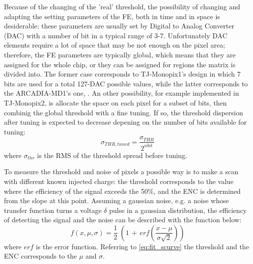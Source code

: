         Because of the changing of the 'real' threshold, the possibility of changing and adapting the setting parameters of the FE, both in time and in space is desiderable: these parameters are usually set by Digital to Analog Converter (DAC) with a number of bit in a typical range of 3-7.
        Unfortunately DAC elements require a lot of space that may be not enough on the pixel area; therefore, the FE parameters are typically global, which means that they are assigned for the whole chip, or they can be assigned for regions the matrix is divided into. 
        The former case corresponds to TJ-Monopix1's design in which 7 bits are used for a total 127-DAC possible values, while the latter corresponds to the ARCADIA-MD1's one, . 
        An other possibility, for example implemented in TJ-Monopix2, is allocate the space on each pixel for a subset of bits, then combinig the global threshold with a fine tuning. 
        If so, the threshold dispersion after tuning is expected to decrease depening on the number of bits available for tuning:
        \begin{equation}
            \sigma_{THR, tuned} = \frac{\sigma_{THR}}{2^{n bit}}
        \end{equation}    
        where $\sigma_{thr}$ is the RMS of the threshold spread before tuning.

        To measure the threshold and noise of pixels a possible way is to make a scan with different known injected charge: the threshold corresponds to the value where the efficiency of the signal exceeds the 50\%, and the ENC is determined from the slope at this point.        
        Assuming a gaussian noise, e.g. a noise whose transfer function turns a voltage $\delta$ pulse in a gaussian distribution, the efficiency of detecting the signal and the noise can be described with  the function below:
        \begin{equation}
            f(x, \mu, \sigma) = \frac{1}{2} \; \left(1\,+\,erf\left(\frac{x-\mu}{\sigma \sqrt{2}}\right)\right)
            \label{eq:fit_scurve}
        \end{equation}
        where $erf$ is the error function. 
        Referring to \ref{eq:fit_scurve} the threshold and the ENC corresponds to the $\mu$ and $\sigma$.
    

